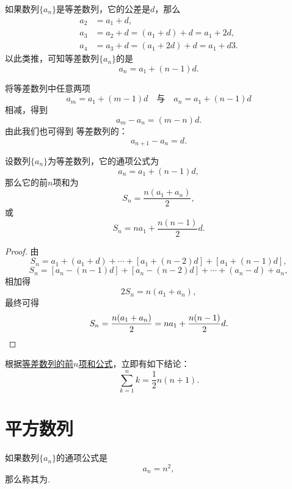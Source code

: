 如果数列\(\{a_n\}\)是等差数列，它的公差是\(d\)，那么\begin{align*}
    a_2 &= a_1 + d, \\
    a_3 &= a_2 + d = (a_1 + d) + d = a_1 + 2d, \\
    a_4 &= a_3 + d = (a_1 + 2d) + d = a_1 + d3.
\end{align*}
以此类推，可知等差数列\(\{a_n\}\)的是\begin{equation}
    a_n = a_1 + (n-1) d.
\end{equation}

将等差数列中任意两项\[
    a_m = a_1 + (m-1) d
    \quad\text{与}\quad
    a_n = a_1 + (n-1) d
\]相减，得到\[
    a_m - a_n = (m-n) d.
\]
由此我们也可得到%
等差数列的：\begin{equation}
    a_{n+1} - a_n = d.
\end{equation}

\begin{property}[等差数列求和]
设数列\(\{a_n\}\)为等差数列，它的通项公式为\[
    a_n = a_1 + (n-1) d,
\]
那么它的前\(n\)项和为\begin{equation}\label{equation:数列.等差数列的前n项和1}
    S_n = \frac{n(a_1 + a_n)}{2},
\end{equation}
或\begin{equation}\label{equation:数列.等差数列的前n项和2}
    S_n = n a_1 + \frac{n(n-1)}{2} d.
\end{equation}
\begin{proof}
由\[
    S_n = a_1 + (a_1 + d) + \dotsb + [a_1 + (n-2)d] + [a_1 + (n-1)d],
\]\[
    S_n = [a_n - (n-1)d] + [a_n - (n-2)d] + \dotsb + (a_n - d) + a_n,
\]相加得\[
    2 S_n = n(a_1 + a_n),
\]最终可得\[
    S_n = \frac{n(a_1 + a_n)}{2} = n a_1 + \frac{n(n-1)}{2} d.
    \qedhere
\]
\end{proof}
\end{property}

根据\hyperref[equation:数列.等差数列的前n项和1]{等差数列的前\(n\)项和公式}，立即有如下结论：
\begin{equation}
    \sum\limits_{k=1}^n k = \frac{1}{2} n(n+1).
\end{equation}

\section{平方数列}
如果数列\(\{a_n\}\)的通项公式是\[
a_n = n^2,
\]那么称其为.

